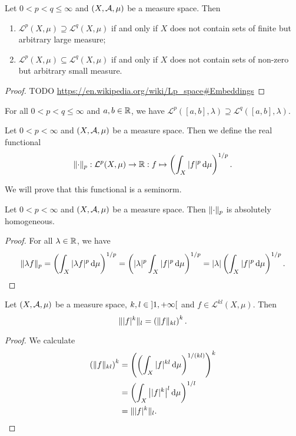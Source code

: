 \begin{proposition}
Let $0< p<q \leq \infty$ and $\sSet{X,\mathcal{A},\mu}$ be a measure space. Then
\begin{enumerate}
\item $\mathcal{L}^p(X,\mu) \supseteq \mathcal{L}^q(X,\mu)$ \textup{if and only if} $X$ does not contain sets of finite but arbitrary large measure;
\item $\mathcal{L}^p(X,\mu) \subseteq \mathcal{L}^q(X,\mu)$ \textup{if and only if} $X$ does not contain sets of non-zero but arbitrary small measure.
\end{enumerate}
\end{proposition}
\begin{proof}
TODO \url{https://en.wikipedia.org/wiki/Lp_space#Embeddings}
\end{proof}
\begin{corollary}
For all $0< p<q \leq \infty$ and $a,b\in\mathbb{R}$, we have $\mathcal{L}^p([a,b],\lambda) \supseteq \mathcal{L}^q([a,b],\lambda)$.
\end{corollary}

\begin{definition}
Let $0< p<\infty$ and $\sSet{X,\mathcal{A},\mu}$ be a measure space. Then we define the real functional
\[ \lVert\cdot\rVert_{p}: \mathcal{L}^p(X,\mu)\to \mathbb{R}: f\mapsto \left(\int_X |f|^p\operatorname{d \!}{\mu}\right)^{1/p}. \]
\end{definition}
We will prove that this functional is a seminorm.

\begin{lemma} \label{pNormAbsolutelyHomogeneous}
Let $0< p<\infty$ and $\sSet{X,\mathcal{A},\mu}$ be a measure space. Then $\lVert\cdot\rVert_p$ is absolutely homogeneous.
\end{lemma}
\begin{proof}
For all $\lambda\in \mathbb{R}$, we have
\[ \lVert\lambda f\rVert_{p} = \left(\int_X |\lambda f|^p\operatorname{d \!}{\mu}\right)^{1/p} = \left(|\lambda|^p\int_X |f|^p\operatorname{d \!}{\mu}\right)^{1/p} = |\lambda|\left(\int_X |f|^p\operatorname{d \!}{\mu}\right)^{1/p}. \]
\end{proof}

\begin{lemma} \label{pnormLemma}
Let $\sSet{X,\mathcal{A},\mu}$ be a measure space, $k,l\in\interval[o]{1,+\infty}$ and $f\in \mathcal{L}^{kl}(X,\mu)$. Then
\[ \lVert|f|^k\rVert_l = \left(\lVert f\rVert_{kl}\right)^k. \]
\end{lemma}
\begin{proof}
We calculate
\begin{align*}
\left(\lVert f\rVert_{kl}\right)^k &= \left(\left(\int_X|f|^{kl}\operatorname{d \!}{\mu}\right)^{1/(kl)}\right)^{k} \\
&= \left(\int_X\big||f|^{k}\big|^l\operatorname{d \!}{\mu}\right)^{1/l} \\
&= \lVert|f|^k\rVert_l.
\end{align*}
\end{proof}

